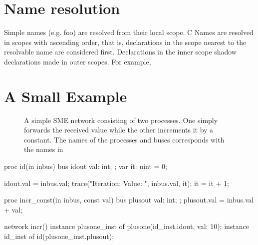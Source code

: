 
\section{Name resolution}
Simple names (e.g. {\ttfamily foo}) are resolved from their local scope. C
Names are resolved in scopes with ascending order, that is, declarations in the
scope nearest to the resolvable name are considered first. Declarations in the
inner scope shadow declarations made in outer scopes. For example, 

\section{A Small Example}
\begin{figure}
  \centering
    \caption{A simple SME network consisting of two processes. One simply
      forwards the received value while the other increments it by a
      constant. The names of the processes and buses corresponds with the names
      in }
  \label{fig:addone}
\end{figure}
\begin{widefigure}
\begin{smeilcode2}
proc id(in inbus)
  bus idout {
    val: int;
  };
  var it: uint = 0;
{
  idout.val = inbus.val;
  trace("Iteration: {} Value: {}",
    inbus.val, it);
  it = it + 1;

}



proc incr_const(in inbus, const val)
  bus plusout {
     val: int;
  };
{
  plusout.val = inbus.val + val;
}

network incr() {
  instance plusone_inst of
    plusone(id_inst.idout, val: 10);
  instance id_inst of
    id(plusone_inst.plusout);
}
\end{smeilcode2}
\caption{An example program written in SMEIL.}
\label{fig:addone.sme}
\end{widefigure}

